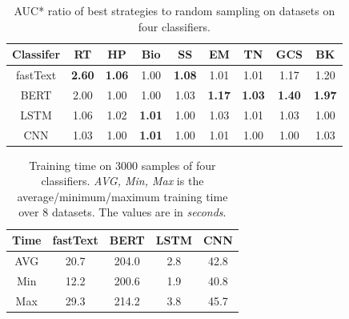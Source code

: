 \begin{table}[th]
	\small
	\centering
	\begin{tabular}{ccccccccc}
		\toprule
		Classifer & RT & HP & Bio & SS & EM & TN & GCS & BK\\ \hline
		fastText & \textbf{2.60} & \textbf{1.06} & 1.00 & \textbf{1.08} & 1.01 & 1.01 & 1.17 & 1.20\\
		BERT & 2.00 & 1.00 & 1.00 & 1.03 & \textbf{1.17} & \textbf{1.03} & \textbf{1.40} & \textbf{1.97}\\ 
		LSTM & 1.06 & 1.02 & \textbf{1.01} & 1.00 & 1.03 & 1.01 & 1.03 & 1.00\\
		CNN & 1.03 & 1.00 & \textbf{1.01} & 1.00 & 1.01 & 1.00 & 1.00 & 1.03\\		
		\bottomrule              
	\end{tabular}
\caption{AUC* ratio of best strategies to random sampling on datasets on four classifiers.}
\label{table:ratioOfClassifiers}
\end{table}
\begin{table}[th]
	\small
	\centering
	\begin{tabular}{ccccc}
		\toprule
		Time & fastText & BERT & LSTM & CNN\\ \hline
		AVG & 20.7 & 204.0 & 2.8 & 42.8  \\
		Min & 12.2 & 200.6 & 1.9 & 40.8\\
		Max & 29.3  & 214.2 & 3.8  & 45.7\\
		\bottomrule  
	\end{tabular}
	\caption{Training time on 3000 samples of four classifiers. \emph{AVG, Min, Max} is the average/minimum/maximum training time over 8 datasets. The values are in \emph{seconds}.}
	\label{table:trainingtime}
\end{table}

